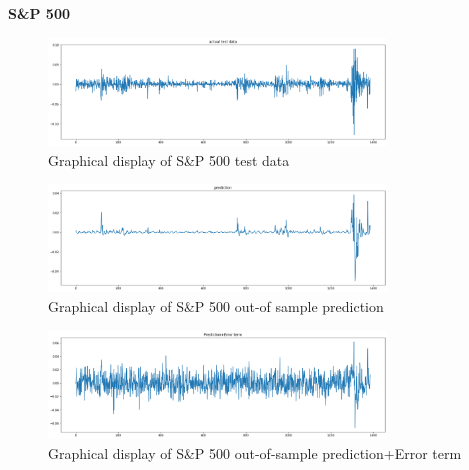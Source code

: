 \documentclass[a4paper,11pt,oneside]{book}
\begin{document}
\newpage
\textbf{S\&P 500}

\begin{figure}[!h]
	\centering
	\includegraphics[width=0.8\textwidth]{figures/sanptest}
	\caption{Graphical display of S\&P 500 test data}
	\label{sanptest}
\end{figure}

\begin{figure}[!h]
	\centering
	\includegraphics[width=0.8\textwidth]{figures/sanppred}
	\caption{Graphical display of S\&P 500 out-of sample prediction}
	\label{sanpred}
\end{figure}


\begin{figure}[!h]
	\centering
	\includegraphics[width=0.8\textwidth]{figures/sanperror}
	\caption{Graphical display of S\&P 500 out-of-sample prediction+Error term}
	\label{sanpERROR}
\end{figure}












\end{document}
